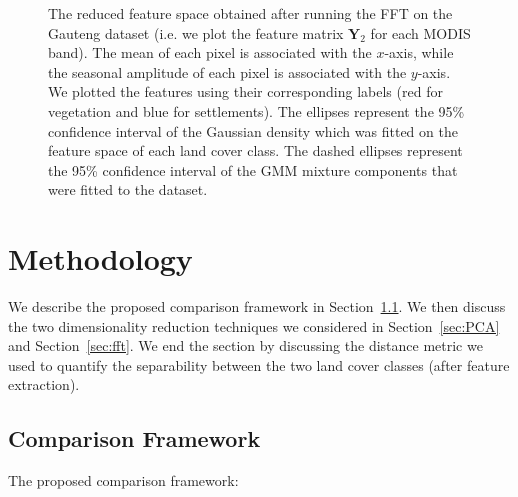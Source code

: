 \documentclass{article}
\begin{document}
\begin{figure}[h!]
%
\caption{The reduced feature space obtained after running the FFT on the Gauteng dataset (i.e. we plot the feature matrix $\mathbf{Y}_2$ for each MODIS band). The mean of each pixel is associated with the $x$-axis, while the seasonal amplitude of each pixel is associated with the $y$-axis. We plotted the features using their corresponding labels (red for vegetation 
and blue for settlements). The ellipses represent the 95\% confidence interval of the Gaussian density which was fitted on the feature space of each land cover class. 
The dashed ellipses represent the 95\% confidence interval of the GMM mixture components that were fitted to the dataset.}
\label{fig:density_FFT}
%
\end{figure}


\section{Methodology}
\label{sec:met}
We describe the proposed comparison framework in Section~\ref{sec:comp}. We then discuss the two dimensionality reduction techniques we considered in Section~\ref{sec:PCA} and Section~\ref{sec:fft}. 
We end the section by discussing the distance metric we used to quantify the separability between the two land cover classes (after feature extraction). 

\subsection{Comparison Framework}
\label{sec:comp}
The proposed comparison framework:
\end{document}
